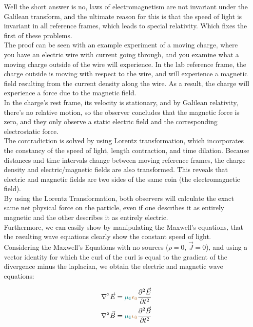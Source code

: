 Well the short answer is no, laws of electromagnetism are not invariant under the Galilean transform, and the ultimate reason for this is that the speed of light is 
invariant in all reference frames, which leads to special relativity. Which fixes the first of these problems.\\

The proof can be seen with an example experiment of a moving charge, where you have an electric wire with current going through, and you examine what a moving charge 
outside of the wire will experience. In the lab reference frame, the charge outside is moving with respect to the wire, and will experience a magnetic field resulting from the current density
along the wire. As a result, the charge will experience a force due to the magnetic field.\\
In the charge's rest frame, its velocity is stationary, and by Galilean relativity, there's no relative motion, so the observer concludes that the magnetic 
force is zero, and they only observe a static electric field and the corresponding electrostatic force.\\

The contradiction is solved by using Lorentz transformation, which incorporates the constancy of the speed of light, length contraction, and time dilation. Because distances and time intervals change between moving reference frames, the charge density and electric/magnetic fields are also transformed. 
This reveals that electric and magnetic fields are two sides of the same coin (the electromagnetic field).\\
By using the Lorentz Transformation, both observers will calculate the exact same net physical force on the particle, even if one describes it as entirely magnetic and the other describes it as entirely electric.\\

Furthermore, we can easily show by manipulating the Maxwell's equations, that the resulting wave equations clearly show the constant speed of light.\\

Considering the Maxwell's Equations with no sources ($\rho = 0$, $\vec{J} = 0$), and using a vector identity for which the curl of the curl is equal to the gradient of the divergence minus
the laplacian, we obtain the electric and magnetic wave equations:

\begin{align*}
\nabla^2\vec{E} &= \begingroup\color{teal}\mu_0\endgroup \begingroup\color{brown}\epsilon_0\endgroup \frac{\partial^2 \vec{E}}{\partial t^2}\\
\nabla^2\vec{B} &= \begingroup\color{teal}\mu_0\endgroup \begingroup\color{brown}\epsilon_0\endgroup \frac{\partial^2 \vec{B}}{\partial t^2}
\end{align*}

